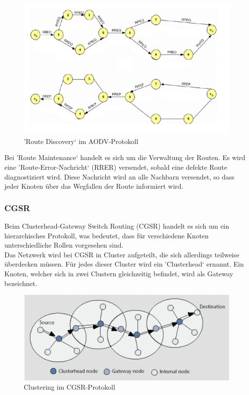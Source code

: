 \begin{figure}[H] 
	\centering
	\includegraphics[scale=0.5]{Bilder/aodv}
	\caption{'Route Discovery‘ im AODV-Protokoll\cite{d:timm}}
	\label{f:aodv}
\end{figure}

Bei 'Route Maintenance‘ handelt es sich um die Verwaltung der Routen. Es wird eine 'Route-Error-Nachricht‘ (RRER) versendet, sobald eine defekte Route diagnostiziert wird. Diese Nachricht wird an alle Nachbarn versendet, so dass jeder Knoten über das Wegfallen der Route informiert wird.
\newpage
\subsubsection{CGSR}\label{ss:CGSR}

Beim Clusterhead-Gateway Switch Routing (CGSR) handelt es sich um ein hierarchisches Protokoll, was bedeutet, dass für verschiedene Knoten unterschiedliche Rollen vorgesehen sind. \\
Das Netzwerk wird bei CGSR in Cluster aufgeteilt, die sich allerdings teilweise überdecken müssen. Für jedes dieser Cluster wird ein 'Clusterhead‘ ernannt. Ein Knoten, welcher sich in zwei Clustern gleichzeitig befindet, wird als Gateway bezeichnet.

\begin{figure}[H] 
	\centering
	\includegraphics[scale=0.5]{Bilder/cgsr}
	\caption{Clustering im CGSR-Protokoll\cite{d:timm}}
	\label{f:cgsr}
\end{figure}

